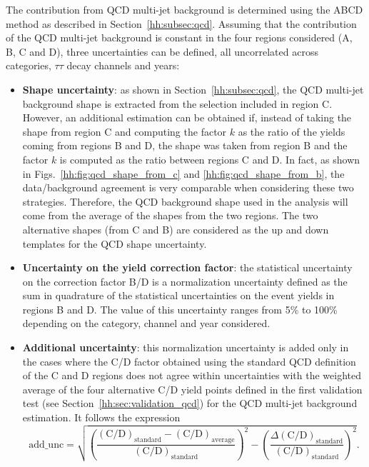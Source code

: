 \documentclass[../main.tex]{subfiles}
\begin{document}
The contribution from QCD multi-jet background is determined using the ABCD method as described in Section~\ref{hh:subsec:qcd}. Assuming that the contribution of the QCD multi-jet background is constant in the four regions considered (A, B, C and D), three uncertainties can be defined, all uncorrelated across categories, $\tau\tau$ decay channels and years:
\begin{itemize}
\item \textbf{Shape uncertainty}: as shown in Section~\ref{hh:subsec:qcd}, the QCD multi-jet background shape is extracted from the selection included in region C. However, an additional estimation can be obtained if, instead of taking the shape from region C and computing the factor $k$ as the ratio of the yields coming from regions B and D, the shape was taken from region B and the factor $k$ is computed as the ratio between regions C and D. In fact, as shown in Figs.~\ref{hh:fig:qcd_shape_from_c} and \ref{hh:fig:qcd_shape_from_b}, the data/background agreement is very comparable when considering these two strategies. Therefore, the QCD background shape used in the analysis will come from the average of the shapes from the two regions. The two alternative shapes (from C and B) are considered as the up and down templates for the QCD shape uncertainty.
\item \textbf{Uncertainty on the yield correction factor}: the statistical uncertainty on the correction factor B/D is a normalization uncertainty defined as the sum in quadrature of the statistical uncertainties on the event yields in regions B and D. The value of this uncertainty ranges from 5\% to 100\% depending on the category, channel and year considered.
\item \textbf{Additional uncertainty}: this normalization uncertainty is added only in the cases where the C/D factor obtained using the standard QCD definition of the C and D regions does not agree within uncertainties with the weighted average of the four alternative C/D yield points defined in the first validation test (see Section~\ref{hh:sec:validation_qcd}) for the QCD multi-jet background estimation. It follows the expression
\begin{equation}
\text{add\_unc} = \sqrt{\left(\frac{(\text{C/D})_{\text{standard}} - (\text{C/D})_{\text{average}}}{(\text{C/D})_{\text{standard}}} \right)^2 - \left(\frac{\Delta(\text{C/D})_{\text{standard}}}{(\text{C/D})_{\text{standard}}} \right)^2}.
\end{equation}
\end{itemize}
\end{document}
